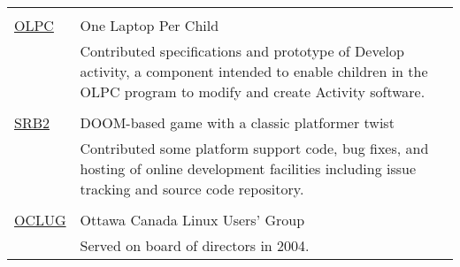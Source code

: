 \documentclass[letterpaper,10pt]{article}
\begin{document}
\begin{longtable}{p{3cm}|p{12cm}}
  \multicolumn{2}{c}{} \\
  \textsc{\href{http://www.laptop.org}{OLPC}} & One Laptop Per Child \\
   & \footnotesize{Contributed specifications and prototype of Develop activity, a component intended to enable children in the OLPC program to modify and create Activity software.} \\
  \multicolumn{2}{c}{} \\
  \textsc{\href{http://www.srb2.org}{SRB2}} & DOOM-based game with a classic platformer twist \\
   & \footnotesize{Contributed some platform support code, bug fixes, and hosting of online development facilities including issue tracking and source code repository.} \\
  \multicolumn{2}{c}{} \\
  \textsc{\href{http://www.oclug.on.ca}{OCLUG}} & Ottawa Canada Linux Users' Group \\
   & \footnotesize{Served on board of directors in 2004.}
\end{longtable}
\end{document}
